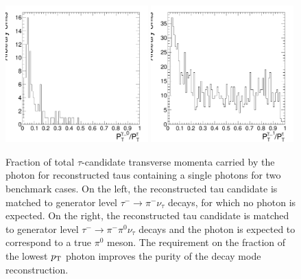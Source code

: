 \begin{figure}[thbp]
  \setlength{\unitlength}{1mm}
  \begin{center}
    \includegraphics*[width=0.49\textwidth]{tanc_chapter/figures/decayModeMergerAndFilter/gammaPtFractionSinglePhotonForDM0.pdf}
    \includegraphics*[width=0.49\textwidth]{tanc_chapter/figures/decayModeMergerAndFilter/gammaPtFractionSinglePhotonForDM1.pdf}
    \caption[Neutral energy fraction in visible $\tau$ decays]{Fraction of total
    $\tau$-candidate transverse momenta carried by the photon for reconstructed
    taus containing a single photons for two benchmark cases.  On the left, the
    reconstructed tau candidate is matched to generator level \mbox{$\tau^{-}
    \rightarrow \pi^{-}\nu_\tau$} decays, for which no photon is expected.  On
    the right, the reconstructed tau candidate is matched to generator level
    \mbox{$\tau^{-} \rightarrow \pi^{-}\pi^0\nu_\tau$} decays and the photon is
    expected to correspond to a true $\pi^0$ meson.  The requirement on the
    \pt fraction of the lowest $p_{\mathrm{T}}$ photon improves the purity of the decay
    mode reconstruction.  } \label{fig:photonFiltering}
  \end{center}
\end{figure}

